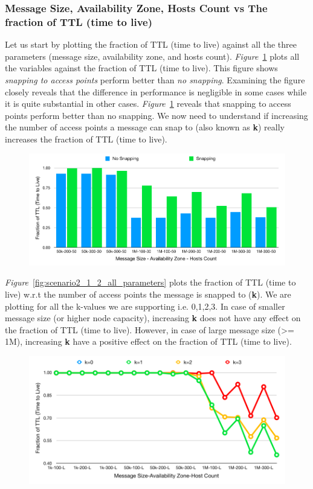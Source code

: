 {\subsubsection{Message Size, Availability Zone, Hosts Count vs The fraction of TTL (time to live)}
Let us start by plotting the fraction of TTL (time to live) against all the three parameters (message size, availability zone, and  hosts count). \emph{Figure}~\ref{fig:scenario2_1_all_parameters} plots all the variables against the fraction of TTL (time to live). This figure shows \textit{snapping to access points} perform better than \textit{no snapping}. Examining the figure closely reveals that the difference in performance is negligible in some cases while it is quite substantial in other cases.
\emph{Figure}~\ref{fig:scenario2_1_all_parameters} reveals that snapping to access points perform better than no snapping. We now need to understand if increasing the number of access points a message can snap to (also known as \textbf{k}) really increases the fraction of TTL (time to live).
\begin{figure}[H]
  \centering
  \includegraphics[scale=0.41]{./figures/scenario2_1_all_parameters}
  \label{fig:scenario2_1_all_parameters}
\end{figure}
\emph{Figure}~\ref{fig:scenario2_1_2_all_parameters} plots the fraction of TTL (time to live) w.r.t the number of access points the message is snapped to (\textbf{k}). We are plotting for all the k-values we are supporting i.e. 0,1,2,3. In case of smaller message size (or higher node capacity), increasing \textbf{k} does not have any effect on the fraction of TTL (time to live). However, in case of large message size (>= 1M), increasing \textbf{k} have a positive effect on the fraction of TTL (time to live).
\begin{figure}[H]
  \centering
  \includegraphics[scale=0.4]{./figures/scenario2_1_2_all_parameters}

\end{figure}}
